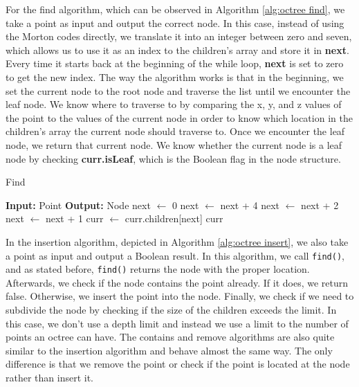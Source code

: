 \documentclass[conference]{IEEEtran}
\begin{document}
For the find algorithm, which can be observed in Algorithm \ref{alg:octree find}, we take a point as input and output the correct node. In this case, instead of using the Morton codes directly, we translate it into an integer between zero and seven, which allows us to use it as an index to the children’s array and store it in \textbf{next}. Every time it starts back at the beginning of the while loop, \textbf{next} is set to zero to get the new index. The way the algorithm works is that in the beginning, we set the current node to the root node and traverse the list until we encounter the leaf node. We know where to traverse to by comparing the x, y, and z values of the point to the values of the current node in order to know which location in the children’s array the current node should traverse to. Once we encounter the leaf node, we return that current node. We know whether the current node is a leaf node by checking \textbf{curr.isLeaf}, which is the Boolean flag in the node structure.

\setcounter{algorithm}{0}
\begin{algorithm}[h]
    \caption{Find}\label{alg:octree find}
    \begin{algorithmic}[1]
        \Statex \textbf{Input:} Point
        \Statex \textbf{Output:} Node
        \State next $\leftarrow$ 0
        \State next $\leftarrow$ next + 4
        \EndIf
        \State next $\leftarrow$ next + 2
        \EndIf
        \State next $\leftarrow$ next + 1
        \EndIf
        \State curr $\leftarrow$ curr.children[next]
        \EndWhile
        \State \Return curr
    \end{algorithmic}
\end{algorithm}

In the insertion algorithm, depicted in Algorithm \ref{alg:octree insert}, we also take a point as input and output a Boolean result. In this algorithm, we call \verb|find()|, and as stated before, \verb|find()| returns the node with the proper location. Afterwards, we check if the node contains the point already. If it does, we return false. Otherwise, we insert the point into the node. Finally, we check if we need to subdivide the node by checking if the size of the children exceeds the limit. In this case, we don’t use a depth limit and instead we use a limit to the number of points an octree can have. The contains and remove algorithms are also quite similar to the insertion algorithm and behave almost the same way. The only difference is that we remove the point or check if the point is located at the node rather than insert it.
\end{document}
